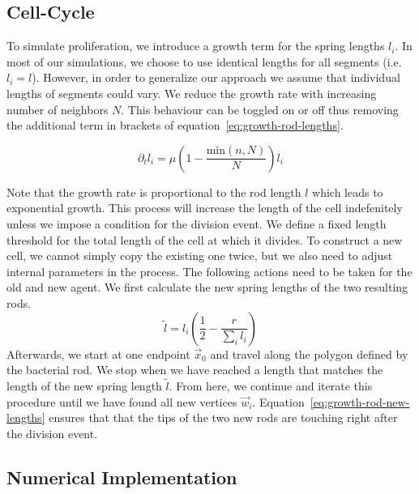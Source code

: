 \documentclass{article}
\begin{document}
\subsection{Cell-Cycle}
\label{subsection:mechanical-model-cycle}

To simulate proliferation, we introduce a growth term for the spring lengths $l_i$.
In most of our simulations, we choose to use identical lengths for all segments (i.e. $l_i=l$).
However, in order to generalize our approach we assume that individual lengths of segments could
vary.
We reduce the growth rate with increasing number of neighbors $N$.
This behaviour can be toggled on or off thus removing the additional term in brackets of
equation~\ref{eq:growth-rod-lengths}.

\begin{equation}
    \partial_t l_i = \mu\left(1-\frac{\text{min}(n,N)}{N}\right)l_i
    \label{eq:growth-rod-lengths}
\end{equation}

Note that the growth rate is proportional to the rod length $l$ which leads to exponential growth.
This process will increase the length of the cell indefenitely unless we impose a condition for the
division event.
We define a fixed length threshold for the total length of the cell at which it divides.
To construct a new cell, we cannot simply copy the existing one twice, but we also need to adjust
internal parameters in the process.
The following actions need to be taken for the old and new agent.
We first calculate the new spring lengths of the two resulting rods.
\begin{equation}
    \tilde{l} = l_i\left(\frac{1}{2} - \frac{r}{\sum\limits_i l_i}\right)
    \label{eq:growth-rod-new-lengths}
\end{equation}
Afterwards, we start at one endpoint $\vec{x}_0$ and travel along the polygon defined by the
bacterial rod.
We stop when we have reached a length that matches the length of the new spring length $\tilde{l}$.
From here, we continue and iterate this procedure until we have found all new vertices $\vec{w}_i$.
Equation~\ref{eq:growth-rod-new-lengths} ensures that that the tips of the two new rods are touching
right after the division event.

\subsection{Numerical Implementation}
\end{document}
